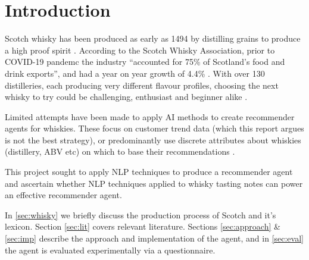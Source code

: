 \section{Introduction}\label{sec:intro}
Scotch whisky has been produced as early as 1494 by distilling grains to produce
a high proof spirit \cite{Jacques2003, Pyke1965}.
According to the Scotch Whisky Association, prior to COVID-19 pandemc the industry 
``accounted for 75\% of Scotland's food and drink exports'', and had a year on year growth of 4.4\% 
\cite{swa2, swa}.
With over 130 distilleries, each producing very different flavour profiles, choosing the next whisky to try 
could be challenging, enthusiast and beginner alike \cite{n_distilleries, powell_2021}.

Limited attempts have been made to apply AI methods to create recommender agents for whiskies.
These focus on customer trend data (which this report argues is not the best strategy), or predominantly
use discrete attributes about whiskies (distillery, ABV etc) on which to base their recommendations
\cite{Omidzohoor, Coldevin2005}.

This project sought to apply NLP techniques to produce a recommender agent and ascertain whether
NLP techniques applied to whisky tasting notes can power an effective recommender agent.  

In \autoref{sec:whisky} we briefly discuss the production process of Scotch and it's lexicon. Section 
\ref{sec:lit} covers relevant literature. Sections 
\ref{sec:approach} \& \ref{sec:imp} describe the approach and implementation of the agent, and in 
\autoref{sec:eval} the agent is evaluated experimentally via a questionnaire.